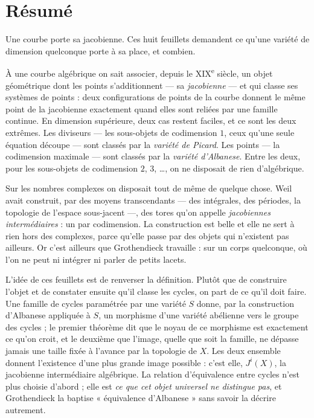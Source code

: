 \documentclass[11pt,a4paper]{article}
\begin{document}
\section*{Résumé}

\begin{resume}
Une courbe porte sa jacobienne. Ces huit feuillets demandent ce qu'une variété
de dimension quelconque porte à sa place, et combien.

À une courbe algébrique on sait associer, depuis le
XIX\textsuperscript{e} siècle, un objet géométrique dont les points
s'additionnent — sa \emph{jacobienne} — et qui classe ses systèmes de points :
deux configurations de points de la courbe donnent le même point de la
jacobienne exactement quand elles sont reliées par une famille continue. En
dimension supérieure, deux cas restent faciles, et ce sont les deux extrêmes.
Les diviseurs — les sous-objets de codimension $1$, ceux qu'une seule équation
découpe — sont classés par la \emph{variété de Picard}. Les points — la
codimension maximale — sont classés par la \emph{variété d'Albanese}. Entre les
deux, pour les sous-objets de codimension $2$, $3$, \ldots, on ne disposait de
rien d'algébrique.

Sur les nombres complexes on disposait tout de même de quelque chose. Weil
avait construit, par des moyens transcendants — des intégrales, des périodes,
la topologie de l'espace sous-jacent —, des tores qu'on appelle
\emph{jacobiennes intermédiaires} : un par codimension. La construction est
belle et elle ne sert à rien hors des complexes, parce qu'elle passe par des
objets qui n'existent pas ailleurs. Or c'est ailleurs que Grothendieck
travaille : sur un corps quelconque, où l'on ne peut ni intégrer ni parler de
petits lacets.

L'idée de ces feuillets est de renverser la définition. Plutôt que de
construire l'objet et de constater ensuite qu'il classe les cycles, on part de
ce qu'il doit faire. Une famille de cycles paramétrée par une variété $S$
donne, par la construction d'Albanese appliquée à $S$, un morphisme d'une
variété abélienne vers le groupe des cycles ; le premier théorème dit que le
noyau de ce morphisme est exactement ce qu'on croit, et le deuxième que
l'image, quelle que soit la famille, ne dépasse jamais une taille fixée à
l'avance par la topologie de $X$. Les deux ensemble donnent l'existence d'une
plus grande image possible : c'est elle, $J^i(X)$, la jacobienne intermédiaire
algébrique. La relation d'équivalence entre cycles n'est plus choisie d'abord ;
elle est \emph{ce que cet objet universel ne distingue pas}, et Grothendieck la
baptise « équivalence d'Albanese » sans savoir la décrire autrement.


\end{resume}
\end{document}
